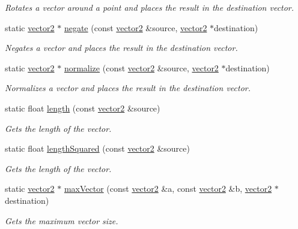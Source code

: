 \begin{DoxyCompactItemize}
\begin{DoxyCompactList}\small\item\em Rotates a vector around a point and places the result in the destination vector. \end{DoxyCompactList}\item 
static \hyperlink{classflounder_1_1vector2}{vector2} $\ast$ \hyperlink{classflounder_1_1vector2_ac51cec72fe6fe9a59d8979e0d4e1f2b5}{negate} (const \hyperlink{classflounder_1_1vector2}{vector2} \&source, \hyperlink{classflounder_1_1vector2}{vector2} $\ast$destination)
\begin{DoxyCompactList}\small\item\em Negates a vector and places the result in the destination vector. \end{DoxyCompactList}\item 
static \hyperlink{classflounder_1_1vector2}{vector2} $\ast$ \hyperlink{classflounder_1_1vector2_ac1bae04e41daf4ba46ae125db1c0b2b0}{normalize} (const \hyperlink{classflounder_1_1vector2}{vector2} \&source, \hyperlink{classflounder_1_1vector2}{vector2} $\ast$destination)
\begin{DoxyCompactList}\small\item\em Normalizes a vector and places the result in the destination vector. \end{DoxyCompactList}\item 
static float \hyperlink{classflounder_1_1vector2_a8205b0963175c8d83f5fd909e56e2c15}{length} (const \hyperlink{classflounder_1_1vector2}{vector2} \&source)
\begin{DoxyCompactList}\small\item\em Gets the length of the vector. \end{DoxyCompactList}\item 
static float \hyperlink{classflounder_1_1vector2_a3cb46839794e2b997814a5a84ffcbde6}{length\+Squared} (const \hyperlink{classflounder_1_1vector2}{vector2} \&source)
\begin{DoxyCompactList}\small\item\em Gets the length of the vector. \end{DoxyCompactList}\item 
static \hyperlink{classflounder_1_1vector2}{vector2} $\ast$ \hyperlink{classflounder_1_1vector2_adf2f16021454ef3091c30a0e090acb6f}{max\+Vector} (const \hyperlink{classflounder_1_1vector2}{vector2} \&a, const \hyperlink{classflounder_1_1vector2}{vector2} \&b, \hyperlink{classflounder_1_1vector2}{vector2} $\ast$destination)
\begin{DoxyCompactList}\small\item\em Gets the maximum vector size. \end{DoxyCompactList}\item 

\end{DoxyCompactItemize}

